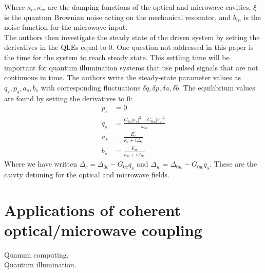 \documentclass[a4paper,10pt,twocolumn]{article}
\numberwithin{equation}{section}
\begin{document}
Where $\kappa_c,\kappa_w$ are the damping functions of the optical and microwave cavities, $\xi$ is the quantum Brownian noise acting on the mechanical resonator,
and $b_{in}$ is the noise function for the microwave input.\\
The authors then investigate the steady state of the driven system by setting the derivatives in the QLEs equal to 0. 
One question not addressed in this paper is the time for the system to reach steady state. 
This settling time will be important for quantum illumination systems that use pulsed signals that are not continuous in time.
The authors  write the steady-state parameter values as $q_s,p_s,a_s, b_s$ with corresponding fluctuations $\delta q,\delta p,\delta a,\delta b$.
The equilibrium values are found by setting the derivatives to 0:
\begin{align}
 p_s &= 0\\
 q_s &= \frac{G_{0c}|a_s|^2+G_{0w}|b_s|^2}{\omega_m}\\
 a_s &= \frac{E_c}{\kappa_c+i\Delta_c}\\
 b_s &= \frac{E_w}{\kappa_w+i\Delta_w}
\end{align}
Where we have written $\Delta_c=\Delta_{0c}-G_{0c}q_s$ and $\Delta_w=\Delta_{0w}-G_{0w}q_s$. 
These are the caivty detuning for the optical and microwave fields. 

\section{Applications of coherent optical/microwave coupling}
Quanum computing.\\
Quantum illumination.
\end{document}
